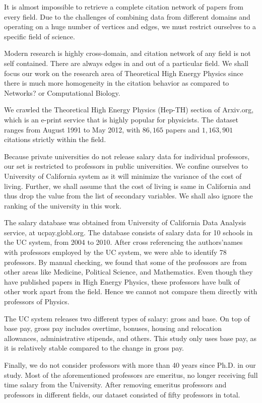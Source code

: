 It is almost impossible to retrieve a complete citation network of papers from every field. Due to the challenges of combining data from different domains and operating on a huge number of vertices and edges, we must restrict ourselves to a specific field of science.

Modern research is highly cross-domain, and citation network of any field is not self contained. There are always edges in and out of a particular field. We shall focus our work on the research area of Theoretical High Energy Physics since there is much more homogeneity in the citation behavior as compared to Networks? or Computational Biology.

We crawled the Theoretical High Energy Physics (Hep-TH) section of Arxiv.org, which is an e-print service that is highly popular for physicists. The dataset ranges from August 1991 to May 2012, with $86,165$ papers and $1,163,901$ citations strictly within the field.

Because private universities do not release salary data for individual professors, our set is restricted to professors in public universities. We confine ourselves to University of California system as it will minimize the variance of the cost of living. Further, we shall assume that the cost of living is same in California and thus drop the value from the list of secondary variables. We shall also ignore the ranking of the university in this work.

The salary database was obtained from University of California Data Analysis service, at ucpay.globl.org. The database consists of salary data for 10 schools in the UC system, from 2004 to 2010. After cross referencing the authors\textquoteright  names with professors employed by the UC system, we were able to identify 78 professors. By manual checking, we found that some of the professors are from other areas like Medicine, Political Science, and Mathematics. Even though they have published papers in High Energy Physics, these professors have bulk of other work apart from the field. Hence we cannot not compare them directly with professors of Physics.

The UC system releases two different types of salary: gross and base. On top of base pay, gross pay includes overtime, bonuses, housing and relocation allowances, administrative stipends, and others. This study only uses base pay, as it is relatively stable compared to the change in gross pay.

Finally, we do not consider professors with more than 40 years since Ph.D. in our study. Most of the aforementioned professors are emeritus, no longer receiving full time salary from the University. After removing emeritus professors and professors in different fields, our dataset consisted of fifty professors in total.
